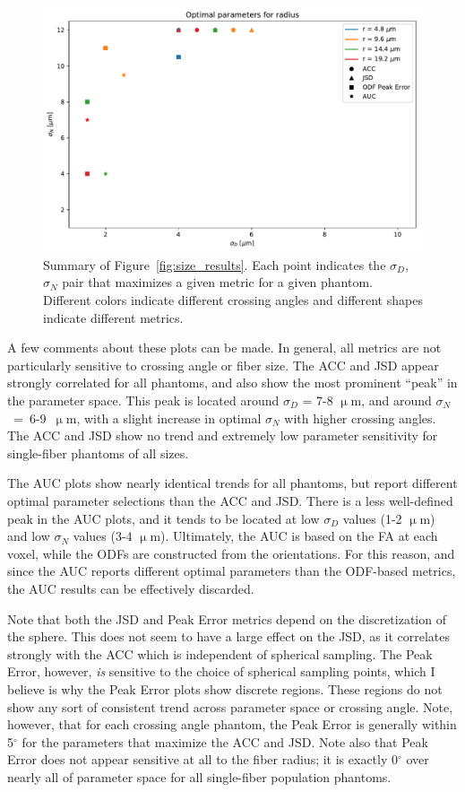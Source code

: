 \documentclass[11pt]{article}
\begin{document}
\begin{figure}[h]
  \centering
  \includegraphics[width=0.7\linewidth]{../analysis/by_size_results/radius_best_params}
  \captionsetup{width=0.7\linewidth}
  \caption{Summary of Figure~\ref{fig:size_results}. Each point indicates the
    $\sigma_D$, $\sigma_N$ pair that maximizes a given metric for a given
    phantom. Different colors indicate different crossing angles and different
    shapes indicate different metrics.}
  \label{fig:size_max_inds}
\end{figure}

A few comments about these plots can be made. In general, all metrics are not
particularly sensitive to crossing angle or fiber size. The ACC and JSD appear
strongly correlated for all phantoms, and also show the most prominent ``peak''
in the parameter space. This peak is located around $\sigma_D$ = 7-8 $\upmu$m,
and around $\sigma_N$~=~6-9~$\upmu$m, with a slight increase in optimal $\sigma_N$
with higher crossing angles. The ACC and JSD show no trend and extremely
low parameter sensitivity for single-fiber phantoms of all sizes.

The AUC plots show nearly identical trends for all phantoms, but report
different optimal parameter selections than the ACC and JSD. There is a
less well-defined peak in the AUC plots, and it tends to be located at low 
$\sigma_D$ values (1-2 $\upmu$m) and low $\sigma_N$ values (3-4 $\upmu$m).
Ultimately, the AUC is based on the FA at each voxel, while the ODFs are
constructed from the orientations. For this reason, and since the AUC
reports different optimal parameters than the ODF-based metrics, the AUC
results can be effectively discarded. 

Note that both the JSD and Peak Error metrics depend on the discretization of
the sphere. This does not seem to have a large effect on the JSD, as it
correlates strongly with the ACC which is independent of spherical sampling.
The Peak Error, however, \textit{is} sensitive to the choice of spherical
sampling points, which I believe is why the Peak Error plots show discrete
regions. These regions do not show any sort of consistent trend across parameter
space or crossing angle. Note, however, that for each crossing angle phantom,
the Peak Error is generally within 5$^{\circ}$ for the parameters that maximize
the ACC and JSD. Note also that Peak Error does not appear sensitive at all to
the fiber radius; it is exactly 0$^{\circ}$ over nearly all of parameter space
for all single-fiber population phantoms.
\end{document}
